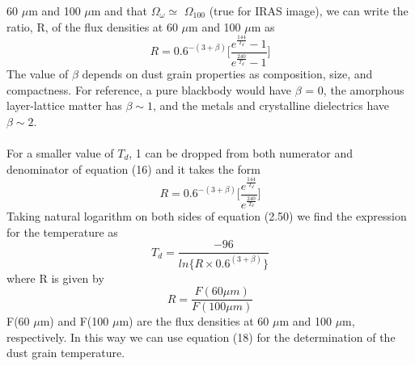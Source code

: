 \documentclass[fleqn,a4paper,12pt,oneside]{article}
\begin{document}
60 $\mu$m and 100 $\mu$m and that $\Omega_{\omega}$$\simeq$
$\Omega_{100}$ (true for IRAS image), we can write the ratio, R,
of the flux densities at 60 $\mu$m and 100 $\mu$m as
\begin{equation}\label{5}
R =  0.6^{-(3+\beta)}\bigg[\frac{e^{\frac{144}{T_{d}}}-1}{e^{\frac{240}{T_{d}}}-1}\bigg]
\end{equation}
The value of $\beta$ depends on dust grain properties as
composition, size, and compactness. For reference, a pure
blackbody would have $\beta$ = 0, the amorphous layer-lattice
matter has $\beta \sim 1$, and the metals and
crystalline dielectrics have $\beta \sim 2$.\\
\\
For a smaller value of $T_{d}$, 1 can be dropped from both
numerator and denominator of equation (16) and it takes the form
\begin{equation}\label{6}
R =
0.6^{-(3+\beta)}\bigg[\frac{e^{\frac{144}{T_{d}}}}{e^{\frac{240}{T_{d}}}}\bigg]
\end{equation}
Taking natural logarithm on both sides of equation (2.50) we find
the expression for the temperature as
\begin{equation}\label{7}
T_{d} = \frac{-96}{ln\{R \times 0.6^{(3+\beta)}\}}
\end{equation}
where R is given by
\begin{equation}\label{8}
R = \frac{F(60 \mu m)}{F(100 \mu m)}
\end{equation}
F(60 $\mu$m) and F(100 $\mu$m) are the flux densities at 60 $\mu$m
and 100 $\mu$m, respectively. In this way we can use equation
(18) for the determination of the dust grain temperature.
\end{document}
